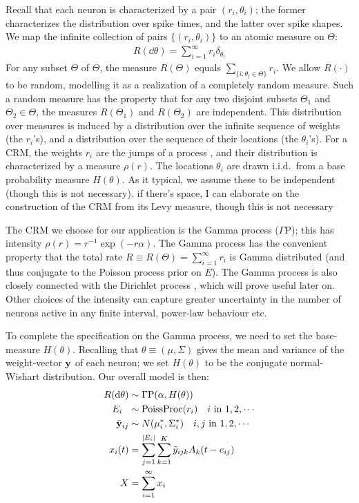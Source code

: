 Recall that each neuron is characterized by a pair $(r_i, \theta_i)$; the former characterizes the distribution over spike times, and the latter over spike
shapes. We map the infinite collection of pairs $\{(r_i, \theta_i)\}$ to an atomic measure on $\Theta$:
\begin{align}
  R(\dd \theta) = \sum_{i=1}^{\infty} r_i \delta_{\theta_i}
\end{align}
For any subset $\varTheta$ of $\Theta$, the measure $R(\varTheta)$ equals \( \sum_{\{ i: \theta_i \in \varTheta \} } r_i\). We allow $R(\cdot)$ to be random,
modelling it as a realization of a completely random measure. Such a random measure has the property that for any two disjoint subsets $\varTheta_1$ 
and $\varTheta_2 \in \Theta$, the measures $R(\varTheta_1)$ and $R(\varTheta_2)$ are independent. 
This distribution over measures is induced by a distribution
over the infinite sequence of weights (the $r_i$'s), and a distribution over the sequence of their locations (the $\theta_i$'s). 
For a CRM, the weights $r_i$ are the jumps of a \Levy process \citep{Sato90}, and their distribution is characterized by a 
\Levy measure $\rho(r)$. The locations $\theta_i$ are drawn i.i.d.\  from a base probability measure $H(\theta)$.
As it typical, we assume these to be independent (though this is not necessary). {\color{red} if there's space, I
can elaborate on the construction of the CRM from its Levy measure, though this is not necessary}

The CRM we choose for our application is the Gamma process ($\Gamma$P); this has \Levy intensity $\rho(r) = r^{-1}\exp(-r\alpha)$. 
The Gamma process has the convenient property that the 
total rate $R \equiv R(\Theta) = \sum_{i=1}^{\infty} r_i$ is Gamma distributed (and thus conjugate to the Poisson process prior on $E$). 
The Gamma process is also closely connected with the Dirichlet process \citep{Ferguson73}, which will prove useful
later on.
Other choices of the \Levy intensity can capture greater uncertainty in the number of neurons active in any finite interval, power-law behaviour etc.

To complete the specification on the Gamma process, we need to set the base-measure $H(\theta)$.
Recalling that $\theta \equiv (\mu, \Sigma)$ gives the mean and variance of the weight-vector $\mathbf{y}$ of each neuron; we set $H(\theta)$ 
to be the conjugate normal-Wishart distribution. Our overall model is then:
\begin{align}
  R(\dd \theta) & \sim \Gamma \text{P}(\alpha, H(\theta)) \\ %
  E_i\ \  &\sim \text{PoissProc}(r_i) \quad i \text{ in } 1,2,\cdots \\
  \tilde{\by}_{ij} & \sim N(\mu^*_i, \Sigma^*_i) \quad i,j \text{ in } 1,2,\cdots \\
  x_i(t) &= \sum_{j = 1}^{|E_i|}  \sum_{k = 1}^{K} \tilde{y}_{ijk} A_k(t - e_{ij}) \\
  X   &= \sum_{i=1}^{\infty} x_i
\end{align}

